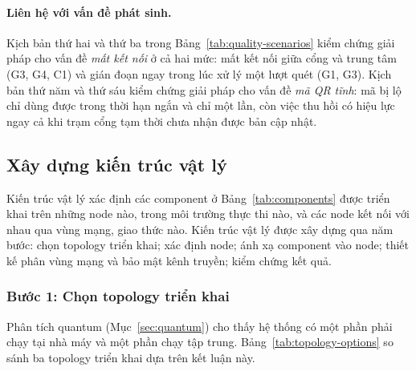 \paragraph{Liên hệ với vấn đề phát sinh.} Kịch bản thứ hai và thứ ba trong Bảng~\ref{tab:quality-scenarios} kiểm chứng giải pháp cho vấn đề \textit{mất kết nối} ở cả hai mức: mất kết nối giữa cổng và trung tâm (G3, G4, C1) và gián đoạn ngay trong lúc xử lý một lượt quét (G1, G3). Kịch bản thứ năm và thứ sáu kiểm chứng giải pháp cho vấn đề \textit{mã QR tĩnh}: mã bị lộ chỉ dùng được trong thời hạn ngắn và chỉ một lần, còn việc thu hồi có hiệu lực ngay cả khi trạm cổng tạm thời chưa nhận được bản cập nhật.

\subsection{Xây dựng kiến trúc vật lý}\label{sec:physical-architecture}
Kiến trúc vật lý xác định các component ở Bảng~\ref{tab:components} được triển khai trên những node nào, trong môi trường thực thi nào, và các node kết nối với nhau qua vùng mạng, giao thức nào. Kiến trúc vật lý được xây dựng qua năm bước: chọn topology triển khai; xác định node; ánh xạ component vào node; thiết kế phân vùng mạng và bảo mật kênh truyền; kiểm chứng kết quả.

\subsubsection{Bước 1: Chọn topology triển khai}\label{sec:physical-step1}
Phân tích quantum (Mục~\ref{sec:quantum}) cho thấy hệ thống có một phần phải chạy tại nhà máy và một phần chạy tập trung. Bảng~\ref{tab:topology-options} so sánh ba topology triển khai dựa trên kết luận này.

